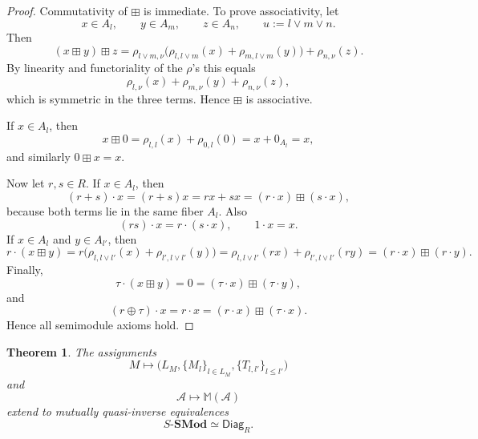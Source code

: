 \documentclass[11pt]{amsart}
\numberwithin{equation}{section}
\newtheorem{theorem}{Theorem}[section]
\theoremstyle{definition}
\newcommand{\Diag}{\mathsf{Diag}}
\newcommand{\SMod}{\mathbf{SMod}}
\begin{document}
\begin{proof}
Commutativity of $\boxplus$ is immediate. To prove associativity, let
\[
x\in A_l,
\qquad
y\in A_m,
\qquad
z\in A_n,
\qquad
u:=l\vee m\vee n.
\]
Then
\[
(x\boxplus y)\boxplus z
=
\rho_{l\vee m,\nu}\bigl(\rho_{l,l\vee m}(x)+\rho_{m,l\vee m}(y)\bigr)+\rho_{n,\nu}(z).
\]
By linearity and functoriality of the $\rho$'s this equals
\[
\rho_{l,\nu}(x)+\rho_{m,\nu}(y)+\rho_{n,\nu}(z),
\]
which is symmetric in the three terms. Hence $\boxplus$ is associative.

If $x\in A_l$, then
\[
x\boxplus 0=\rho_{l,l}(x)+\rho_{0,l}(0)=x+0_{A_l}=x,
\]
and similarly $0\boxplus x=x$.

Now let $r,s\in R$. If $x\in A_l$, then
\[
(r+s)\cdot x=(r+s)x=rx+sx=(r\cdot x)\boxplus (s\cdot x),
\]
because both terms lie in the same fiber $A_l$. Also
\[
(rs)\cdot x=r\cdot(s\cdot x),
\qquad
1\cdot x=x.
\]
If $x\in A_l$ and $y\in A_{l'}$, then
\[
r\cdot(x\boxplus y)
=
r\bigl(\rho_{l,l\vee l'}(x)+\rho_{l',l\vee l'}(y)\bigr)
=
\rho_{l,l\vee l'}(rx)+\rho_{l',l\vee l'}(ry)
=
(r\cdot x)\boxplus(r\cdot y).
\]
Finally,
\[
\tau\cdot(x\boxplus y)=0=(\tau\cdot x)\boxplus(\tau\cdot y),
\]
and
\[
(r\oplus\tau)\cdot x=r\cdot x=(r\cdot x)\boxplus(\tau\cdot x).
\]
Hence all semimodule axioms hold. 
\end{proof}

\begin{theorem}\label{thm:equivalence-semimodules-diagrams}
The assignments
\[
M\longmapsto\bigl(L_M,\{M_l\}_{l\in L_M},\{T_{l,l'}\}_{l\le l'}\bigr)
\]
and
\[
\mathcal A\longmapsto \mathbb M(\mathcal A)
\]
extend to mutually quasi-inverse equivalences
\[
\boxed{
S\text{-}\SMod\simeq \Diag_R.
}
\]
\end{theorem}
\end{document}
